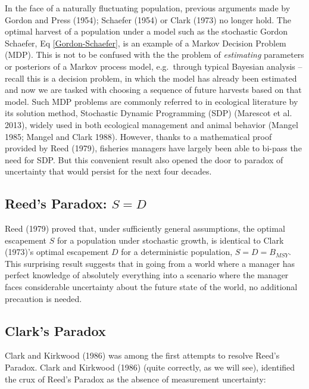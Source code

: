 \documentclass[3p]{elsarticle} %
\begin{document}
In the face of a naturally fluctuating population, previous arguments
made by Gordon and Press (1954); Schaefer (1954) or Clark (1973) no
longer hold. The optimal harvest of a population under a model such as
the stochastic Gordon Schaefer, Eq \eqref{Gordon-Schaefer}, is an
example of a Markov Decision Problem (MDP). This is not to be confused
with the the problem of \emph{estimating} parameters or posteriors of a
Markov process model, e.g.~through typical Bayesian analysis -- recall
this is a decision problem, in which the model has already been
estimated and now we are tasked with choosing a sequence of future
harvests based on that model. Such MDP problems are commonly referred to
in ecological literature by its solution method, Stochastic Dynamic
Programming (SDP) (Marescot et al. 2013), widely used in both ecological
management and animal behavior (Mangel 1985; Mangel and Clark 1988).
However, thanks to a mathematical proof provided by Reed (1979),
fisheries managers have largely been able to bi-pass the need for SDP.
But this convenient result also opened the door to paradox of
uncertainty that would persist for the next four decades.

\hypertarget{reeds-paradox-s-d}{%
\subsection{\texorpdfstring{Reed's Paradox:
\(S = D\)}{Reed's Paradox: S = D}}\label{reeds-paradox-s-d}}

Reed (1979) proved that, under sufficiently general assumptions, the
optimal escapement \(S\) for a population under stochastic growth, is
identical to Clark (1973)'s optimal escapement \(D\) for a deterministic
population, \(S = D = B_{MSY}\). This surprising result suggests that in
going from a world where a manager has perfect knowledge of absolutely
everything into a scenario where the manager faces considerable
uncertainty about the future state of the world, no additional
precaution is needed.

\hypertarget{clarks-paradox}{%
\subsection{Clark's Paradox}\label{clarks-paradox}}

Clark and Kirkwood (1986) was among the first attempts to resolve Reed's
Paradox. Clark and Kirkwood (1986) (quite correctly, as we will see),
identified the crux of Reed's Paradox as the absence of measurement
uncertainty:
\end{document}
